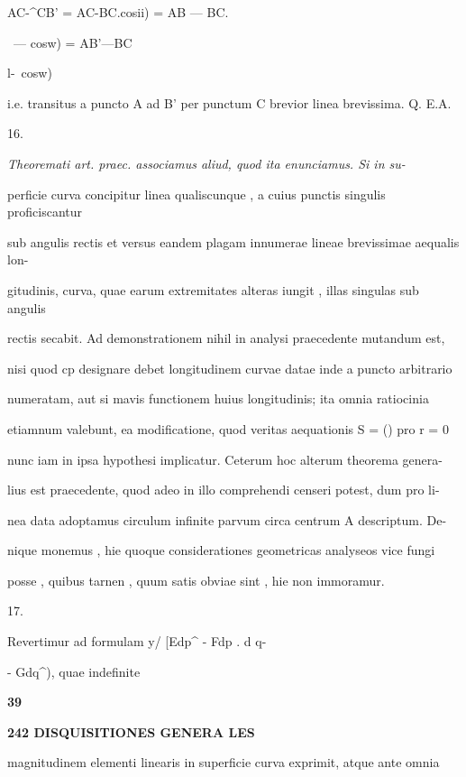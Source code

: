 \documentclass[12pt,a4paper]{article}
\begin{document}
AC-^CB'  =  AC-\-BC.cosii)  =  AB  —  BC.{\  —  cosw)  =  AB'—BC{l-~cosw)

i.e.  transitus  a  puncto  A  ad  B'  per  punctum  C  brevior  linea  brevissima.  Q.  E.A.

16.

\par\noindent\textit{Theoremati  art.  praec.  associamus  aliud,  quod  ita  enunciamus.  Si  in  su-}

perficie curva  concipitur  linea  qualiscunque ,  a  cuius  punctis  singulis  proficiscantur

sub  angulis  rectis  et  versus  eandem  plagam  innumerae  lineae  brevissimae  aequalis  lon-

gitudinis, curva,  quae  earum  extremitates  alteras  iungit ,  illas  singulas  sub  angulis

rectis  secabit.  Ad  demonstrationem  nihil  in  analysi  praecedente  mutandum  est,

nisi  quod  cp  designare  debet  longitudinem  curvae  datae  inde  a  puncto  arbitrario

numeratam,  aut  si  mavis  functionem  huius  longitudinis;  ita  omnia  ratiocinia

etiamnum  valebunt,  ea  modificatione,  quod  veritas  aequationis  S  =  ()  pro  r  =  0

nunc  iam  in  ipsa  hypothesi  implicatur.  Ceterum  hoc  alterum  theorema  genera-

lius  est  praecedente,  quod  adeo  in  illo  comprehendi  censeri  potest,  dum  pro  li-

nea data  adoptamus  circulum  infinite  parvum  circa  centrum  A  descriptum.  De-

nique  monemus ,  hie  quoque  considerationes  geometricas  analyseos  vice  fungi

posse ,  quibus  tarnen ,  quum  satis  obviae  sint ,  hie  non  immoramur.

17.

Revertimur  ad  formulam    y/  [Edp^  -  Fdp .  d  q-{-  Gdq^),    quae  indefinite

\par\noindent\textbf{39}

\newpage
\setcounter{page}{242}

\noindent\textbf{242  DISQUISITIONES  GENERA  LES}\par

magnitudinem  elementi  linearis  in  superficie  curva  exprimit,  atque  ante  omnia

}}}
\end{document}
